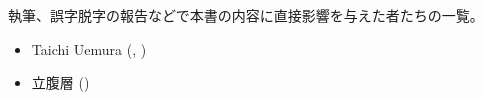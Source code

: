 \documentclass[index]{subfiles}
\begin{document}

執筆、誤字脱字の報告などで本書の内容に直接影響を与えた者たちの一覧。

\begin{itemize}
\item Taichi Uemura (, )
\item 立腹層 ()
\end{itemize}
\end{document}
